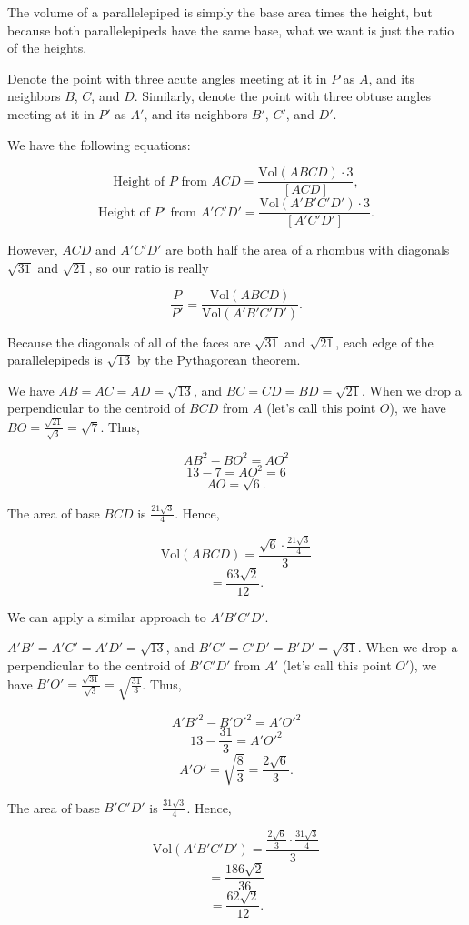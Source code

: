 \begin{enumerate}
{{ The volume of a parallelepiped is simply the base area times the height, but because both parallelepipeds have the same base, what we want is just the ratio of the heights.

 Denote the point with three acute angles meeting at it in $P$ as $A$, and its neighbors $B$, $C$, and $D$. Similarly, denote the point with three obtuse angles meeting at it in $P'$ as $A'$, and its neighbors $B'$, $C'$, and $D'$.

 We have the following equations:

 
 \[\textrm{Height of }P\textrm{ from }ACD = \frac{\textrm{Vol}(ABCD) \cdot 3}{[ACD]},\]
 \[\textrm{Height of }P'\textrm{ from }A'C'D' = \frac{\textrm{Vol}(A'B'C'D') \cdot 3}{[A'C'D']}.\]

 However, $ACD$ and $A'C'D'$ are both half the area of a rhombus with diagonals $\sqrt{31}$ and $\sqrt{21}$, so our ratio is really

 
 \[\frac{P}{P'} = \frac{\textrm{Vol}(ABCD)}{\textrm{Vol}(A'B'C'D')}.\]

 Because the diagonals of all of the faces are $\sqrt{31}$ and $\sqrt{21}$, each edge of the parallelepipeds is $\sqrt{13}$ by the Pythagorean theorem. 

 We have $AB = AC = AD = \sqrt{13}$, and $BC = CD = BD = \sqrt{21}$. When we drop a perpendicular to the centroid of $BCD$ from $A$ (let's call this point $O$), we have $BO = \frac{\sqrt{21}}{\sqrt{3}} = \sqrt{7}$. Thus, 

 
 \[AB^2 - BO^2 = AO^2\]
 \[13 - 7 = AO^2 = 6\]
 \[AO = \sqrt{6}.\]

 The area of base $BCD$ is $\frac{21\sqrt{3}}{4}$. Hence, 

 
 \[\textrm{Vol}(ABCD) = \frac{\sqrt{6}\cdot\frac{21\sqrt{3}}{4}}{3}\]
 \[= \frac{63\sqrt{2}}{12}.\]

 We can apply a similar approach to $A'B'C'D'$.

 $A'B' = A'C' = A'D' = \sqrt{13}$, and $B'C' = C'D' = B'D' = \sqrt{31}$. When we drop a perpendicular to the centroid of $B'C'D'$ from $A'$ (let's call this point $O'$), we have $B'O' = \frac{\sqrt{31}}{\sqrt{3}} = \sqrt{\frac{31}{3}}$. Thus, 

 
 \[A'B'^2 - B'O'^2 = A'O'^2\]
 \[13 - \frac{31}{3} = A'O'^2\]
 \[A'O' = \sqrt{\frac{8}{3}} = \frac{2\sqrt{6}}{3}.\]

 The area of base $B'C'D'$ is $\frac{31\sqrt{3}}{4}$. Hence, 

 
 \[\textrm{Vol}(A'B'C'D') = \frac{\frac{2\sqrt{6}}{3}\cdot\frac{31\sqrt{3}}{4}}{3}\]
 \[= \frac{186\sqrt{2}}{36}\]
 \[= \frac{62\sqrt{2}}{12}.\]

}}
\end{enumerate}
